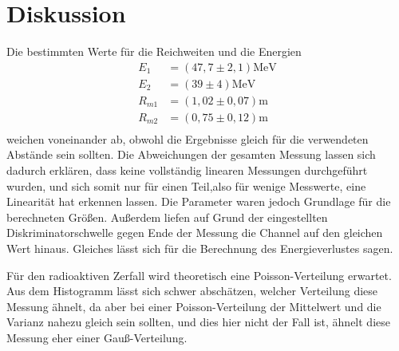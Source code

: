 \section{Diskussion}
\label{sec:Diskussion}

Die bestimmten Werte für die Reichweiten und die Energien
\begin{align*}
E_{1} &= (47,7 \pm 2,1) \si{\MeV}\\
E_{2} &= (39 \pm 4) \si{\MeV}\\
R_{m1} &= (1,02 \pm 0,07) \si{\meter}\\
R_{m2} &= (0,75 \pm 0,12) \si{\meter}\\
\end{align*}
weichen voneinander ab, obwohl die Ergebnisse gleich für die verwendeten Abstände sein sollten.
Die Abweichungen der gesamten Messung lassen sich dadurch erklären, dass keine vollständig linearen Messungen durchgeführt wurden,
und sich somit nur für einen Teil,also für wenige Messwerte, eine Linearität hat erkennen lassen. Die Parameter waren jedoch Grundlage für die berechneten Größen.
Außerdem liefen auf Grund der eingestellten Diskriminatorschwelle gegen Ende der Messung die Channel auf den gleichen Wert hinaus.
Gleiches lässt sich für die Berechnung des Energieverlustes sagen.

\noindent Für den radioaktiven Zerfall wird theoretisch eine Poisson-Verteilung erwartet. Aus dem Histogramm lässt sich schwer abschätzen, welcher Verteilung diese Messung ähnelt,
da aber bei einer Poisson-Verteilung der Mittelwert und die Varianz nahezu gleich sein sollten, und dies hier nicht der Fall ist, ähnelt diese Messung eher einer Gauß-Verteilung.
